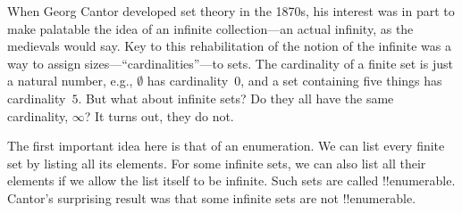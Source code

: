 \documentclass[../../include/open-logic-section]{subfiles}
\begin{document}


When Georg Cantor developed set theory in the 1870s, his interest was
in part to make palatable the idea of an infinite collection---an
actual infinity, as the medievals would say.  Key to this
rehabilitation of the notion of the infinite was a way to assign
sizes---``cardinalities''---to sets.  The cardinality of a finite set
is just a natural number, e.g., $\emptyset$ has cardinality~0, and a
set containing five things has cardinality~$5$.  But what about
infinite sets?  Do they all have the same cardinality, $\infty$?  It
turns out, they do not.

The first important idea here is that of an enumeration.  We can list
every finite set by listing all its elements.  For some infinite sets,
we can also list all their elements if we allow the list itself to be
infinite.  Such sets are called !!{enumerable}.  Cantor's surprising
result was that some infinite sets are not !!{enumerable}.
\end{document}
